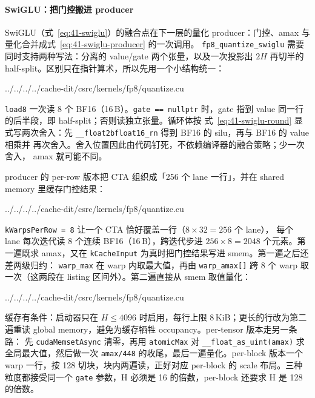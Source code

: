 \paragraph{SwiGLU：把门控搬进 producer}

SwiGLU（式~\ref{eq:41-swiglu}）的融合点在下一层的量化 producer：门控、amax
与量化合并成式~\ref{eq:41-swiglu-producer} 的一次调用。
\texttt{fp8\_quantize\_swiglu} 需要
同时支持两种写法：分离的 value/gate 两个张量，以及一次投影出 $2H$ 再切半的
half-split。区别只在指针算术，所以先用一个小结构统一：

\begin{lstinputlisting}[linerange={382-404},firstnumber=auto,
  title={cache-dit fp8/quantize.cu L382--404（两种 SwiGLU 布局的统一读取）}]{../../../../cache-dit/csrc/kernels/fp8/quantize.cu}
\end{lstinputlisting}

\texttt{load8} 一次读 8 个 BF16（16\,B）。\texttt{gate == nullptr} 时，gate
指到 value 同一行的后半段，即 half-split；否则读独立张量。循环体按
式~\ref{eq:41-swiglu-round} 显式写两次舍入：先
\texttt{\_\_float2bfloat16\_rn} 得到 BF16 的 silu，再与 BF16 的 value 相乘并
再次舍入。舍入位置因此由代码钉死，不依赖编译器的融合策略；少一次舍入，
amax 就可能不同。

producer 的 per-row 版本把 CTA 组织成「256 个 lane 一行」，并在 shared memory
里缓存门控结果：

\begin{lstinputlisting}[linerange={406-434},firstnumber=auto,
  title={cache-dit fp8/quantize.cu L406--434（per-row SwiGLU：第一遍逐 lane 求 amax 并缓存）}]{../../../../cache-dit/csrc/kernels/fp8/quantize.cu}
\end{lstinputlisting}

\texttt{kWarpsPerRow = 8} 让一个 CTA 恰好覆盖一行（$8\times32=256$ 个 lane），
每个 lane 每次迭代读 8 个连续 BF16（16\,B），跨迭代步进 $256\times8=2048$
个元素。第一遍既求 amax，又在
\texttt{kCacheInput} 为真时把门控结果写进 smem。第一遍之后还差两级归约：
\texttt{warp\_max} 在 warp 内取最大值，再由 \texttt{warp\_amax[]} 跨 8 个 warp
取一次（这两段在 listing 区间外）。第二遍直接从 smem 取值量化：

\begin{lstinputlisting}[linerange={448-463},firstnumber=auto,
  title={cache-dit fp8/quantize.cu L448--463（第二遍复用缓存并写出 scale/qdata）}]{../../../../cache-dit/csrc/kernels/fp8/quantize.cu}
\end{lstinputlisting}

缓存有条件：启动器只在 $H\le 4096$ 时启用，每行上限 8\,KiB；更长的行改为第二
遍重读 global memory，避免为缓存牺牲 occupancy。per-tensor 版本走另一条路：
先 \texttt{cudaMemsetAsync} 清零，再用 \texttt{atomicMax} 对
\texttt{\_\_float\_as\_uint(amax)} 求全局最大值，然后做一次
\texttt{amax/448} 的收尾，最后一遍量化。per-block 版本一个 warp 一行，按 128
切块，块内两遍读，正好对应 per-block 的 scale 布局。三种粒度都接受同一个
\texttt{gate} 参数，H 必须是 16 的倍数，per-block 还要求 H 是 128 的倍数。

